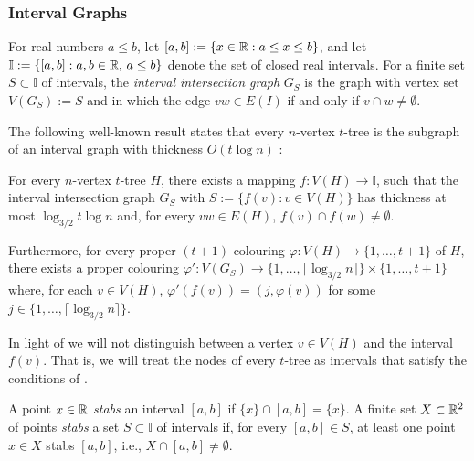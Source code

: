 \documentclass[kpfonts]{patmorin}
\newcommand{\snote}[1]{\fcolorbox{red}{yellow}{#1}}
\begin{document}
\subsubsection{Interval Graphs}

For real numbers $a\le b$, let $[a,b]:=\{ x\in\mathbb{R}: a\le x\le b\}$, and let
$\mathbb{I}:=\{[a,b]: a,b\in\mathbb{R},\, a\le b\}$ denote the set of closed real intervals.  For a finite set $S\subset\mathbb{I}$ of intervals, the \emph{interval intersection graph} $G_S$ is the graph with vertex set $V(G_S):=S$ and in which the edge $vw\in E(I)$ if and only if $v\cap w\neq \emptyset$.  


The following well-known result states that every $n$-vertex $t$-tree is the subgraph of an interval graph with thickness $O(t\log n)$ \snote{Help: reference?}:

\begin{lem}
  For every $n$-vertex $t$-tree $H$, there exists a mapping $f:V(H)\to\mathbb{I}$, such that the interval intersection graph $G_S$ with $S:=\{f(v):v\in V(H)\}$ has thickness at most $\log_{3/2} t\log n$ and, for every $vw\in E(H)$, $f(v)\cap f(w)\neq\emptyset$.  
  
  Furthermore, for every proper $(t+1)$-colouring $\varphi:V(H)\to\{1,\ldots,t+1\}$ of $H$, there exists a proper colouring $\varphi':V(G_S)\to\{1,\ldots,\lceil\log_{3/2} n\rceil\}\times\{1,\ldots,t+1\}$ where, for each $v\in V(H)$, $\varphi'(f(v))=(j,\varphi(v))$ for some $j\in\{1,\ldots,\lceil\log_{3/2} n\rceil\}$.
\end{lem}

In light of  we will not distinguish between a vertex $v\in V(H)$ and the interval $f(v)$.  That is, we will treat the nodes of every $t$-tree as intervals that satisfy the conditions of .

A point $x\in\mathbb{R}$ \emph{stabs} an interval $[a,b]$ if $\{x\}\cap [a,b]=\{x\}$. A finite set $X\subset\mathbb{R}^2$ of points \emph{stabs} a set $S\subset\mathbb{I}$ of intervals if, for every $[a,b]\in S$, at least one point $x\in X$ stabs $[a,b]$, i.e., $X\cap [a,b]\neq\emptyset$.
\end{document}
